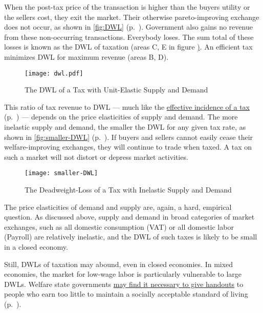 When the post-tax price of the transaction is higher than the buyers utility or the sellers cost, they exit the market.
Their otherwise pareto-improving exchange does not occur, as shown in \autoref{fig:DWL} (p.~\pageref{fig:DWL}).
Government also gains no revenue from these non-occurring transactions.
Everybody loses.
The sum total of these losses is known as the \gls{DWL} of taxation (areas C, E in figure \href{fig:DWL}).
An efficient tax minimizes \gls{DWL} for maximum revenue (areas B, D).

\begin{figure}[htbp]
	\centering
	\texttt{[image: dwl.pdf]}
	\caption[Deadweight-Loss of a Tax with Unit-Elastic Supply and Demand]{The \gls{DWL} of a Tax with Unit-Elastic Supply and Demand}
	\label{fig:DWL}
\end{figure}

This ratio of tax revenue to \gls{DWL} --- much like the \hyperref[sec:well-determined-incidence]{effective incidence of a tax} (p.~\pageref{sec:well-determined-incidence}) --- depends on the price elasticities of supply and demand.
The more inelastic supply and demand, the smaller the \gls{DWL} for any given tax rate, as shown in \autoref{fig:smaller-DWL} (p.~\pageref{fig:smaller-DWL}).
If buyers and sellers cannot easily cease their welfare-improving exchanges, they will continue to trade when taxed.
A tax on such a market will not distort or depress market activities.

\begin{figure}[htbp]
	\centering
	\texttt{[image: smaller-DWL]}
	\caption[Deadweight-Loss of a Tax with Inelastic Suppy and Demand]{The Deadweight-Loss of a Tax with Inelastic Supply and Demand}
	\label{fig:smaller-DWL}
\end{figure}

The price elasticities of demand and supply are, again, a hard, empirical question.
As discussed above, supply and demand in broad categories of market exchanges, such as all domestic consumption (\gls{VAT}) or all domestic labor (\gls{Payroll}) are relatively inelastic, and the \gls{DWL} of such taxes is likely to be small in a closed economy.

Still, \glspl{DWL} of taxation may abound, even in closed economies.
In mixed economies, the market for low-wage labor is particularly vulnerable to large \gls{DWL}s.
Welfare state governments  \hyperref[sec:distribution]{may find it necessary to give handouts} to people who earn too little to maintain a socially acceptable standard of living (p.~\pageref{sec:distribution}).

